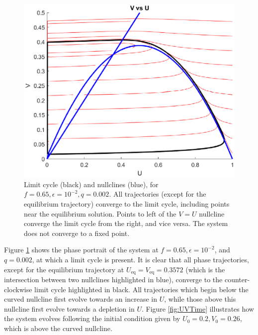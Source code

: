 \documentclass[twocolumn,amsmath,amssymb,aps]{revtex4}
\begin{document}
\begin{figure}[!htb]
	\includegraphics[scale=0.5]{limit_cycle_f_065_e_1e-2.eps}
	\caption{Limit cycle (black) and nullclines (blue), for $f = 0.65, \epsilon = 10^{-2}, q = 0.002$. All trajectories (except for the equilibrium trajectory) converge to the limit cycle, including points near the equilibrium solution. Points to left of the $V=U$ nullcline converge the limit cycle from the right, and vice versa. The system does not converge to  a fixed point.}
	\label{fig:LC}
\end{figure}

Figure \ref{fig:LC} shows the phase portrait of the system at $f = 0.65, \epsilon = 10^{-2}$, and $q = 0.002$, at which a limit cycle is present. It is clear that all phase trajectories, except for the equilibrium trajectory at $U_{\text{eq}} = V_{\text{eq}} = 0.3572$ (which is the intersection between two nullclines highlighted in blue), converge to the counter-clockwise limit cycle highlighted in black. All trajectories which begin below the curved nullcline first evolve towards an increase in $U$, while those above this nullcline first evolve towards a depletion in $U$. Figure \ref{fig:UVTime} illustrates how the system evolves following the initial condition given by $U_0 = 0.2, V_0 = 0.26$, which is above the curved nullcline. 
\end{document}
